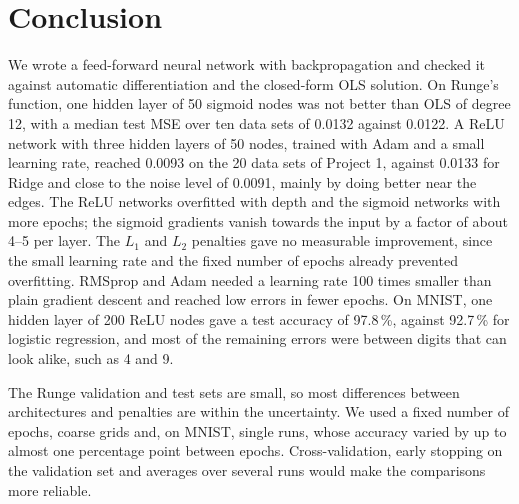 
\section*{Conclusion}

We wrote a feed-forward neural network with backpropagation and checked it against automatic differentiation and the closed-form OLS solution. On Runge's function, one hidden layer of 50 sigmoid nodes was not better than OLS of degree 12, with a median test MSE over ten data sets of 0.0132 against 0.0122. A ReLU network with three hidden layers of 50 nodes, trained with Adam and a small learning rate, reached 0.0093 on the 20 data sets of Project 1, against 0.0133 for Ridge and close to the noise level of 0.0091, mainly by doing better near the edges. The ReLU networks overfitted with depth and the sigmoid networks with more epochs; the sigmoid gradients vanish towards the input by a factor of about 4--5 per layer. The $L_1$ and $L_2$ penalties gave no measurable improvement, since the small learning rate and the fixed number of epochs already prevented overfitting. RMSprop and Adam needed a learning rate 100 times smaller than plain gradient descent and reached low errors in fewer epochs. On MNIST, one hidden layer of 200 ReLU nodes gave a test accuracy of 97.8\,\%, against 92.7\,\% for logistic regression, and most of the remaining errors were between digits that can look alike, such as 4 and 9.

The Runge validation and test sets are small, so most differences between architectures and penalties are within the uncertainty. We used a fixed number of epochs, coarse grids and, on MNIST, single runs, whose accuracy varied by up to almost one percentage point between epochs. Cross-validation, early stopping on the validation set and averages over several runs would make the comparisons more reliable.
